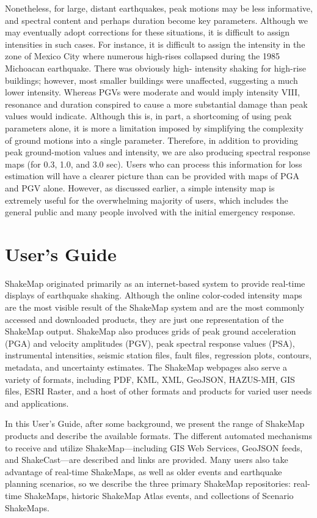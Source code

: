 \documentclass[letterpaper,10pt,english]{sphinxmanual}
\begin{document}
Nonetheless, for large, distant earthquakes, peak motions may be less informative, and
spectral content and perhaps duration become key parameters.  Although we may eventually
adopt corrections for these situations, it is difficult to assign intensities in such cases. For
instance, it is difficult to assign the intensity in the zone of Mexico City where numerous
high-rises collapsed during the 1985 Michoacan earthquake. There was obviously high-
intensity shaking for high-rise buildings; however, most smaller buildings were
unaffected, suggesting a much lower intensity.  Whereas PGVs were
moderate and would imply intensity VIII, resonance and duration conspired to cause a
more substantial damage than peak values would indicate. Although this is, in part, a
shortcoming of using peak parameters alone, it is more a limitation imposed by
simplifying the complexity of ground motions into a single parameter. Therefore, in
addition to providing peak ground-motion values and intensity, we are also producing
spectral response maps (for 0.3, 1.0, and 3.0 sec). Users who can process this information
for loss estimation will have a clearer picture than can be provided with maps of PGA
and PGV alone. However, as discussed earlier, a simple intensity map is extremely useful
for the overwhelming majority of users, which includes the general public and many
people involved with the initial emergency response.


\chapter{User's Guide}
\label{users_guide:user-s-guide}\label{users_guide:users-guide}\label{users_guide::doc}
ShakeMap originated primarily as an internet-based system to provide
real-time displays of earthquake shaking.
Although the online color-coded intensity maps are the most visible result of
the ShakeMap system and are the most commonly accessed and downloaded
products, they are just one representation of the ShakeMap output. ShakeMap also
produces grids of peak ground acceleration (PGA) and velocity
amplitudes (PGV), peak
spectral response values (PSA), instrumental intensities, seismic station files, fault
files, regression plots, contours, metadata, and uncertainty
estimates. The ShakeMap webpages also serve a variety of formats, including
PDF, KML, XML, GeoJSON, HAZUS-MH, GIS files, ESRI Raster, and a host of other
formats and products for varied user needs and applications.

In this User's Guide, after some background, we present the range of ShakeMap
products and describe the available formats. The different automated mechanisms
to receive and utilize ShakeMap---including GIS Web Services, GeoJSON feeds,
and ShakeCast---are described and links are provided. Many users also
take advantage of real-time ShakeMaps, as well as older events and earthquake
planning scenarios, so we describe the three primary ShakeMap repositories:
real-time ShakeMaps, historic ShakeMap Atlas events, and collections of
Scenario ShakeMaps.
\end{document}
